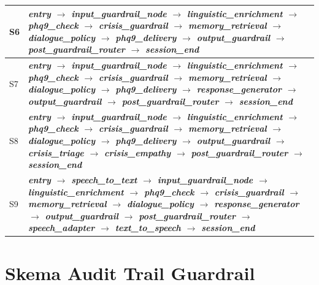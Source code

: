 \begin{longtable}{|>{\raggedright\arraybackslash}p{1.0cm}|>{\raggedright\arraybackslash}p{11.9cm}|}
\hline
S6 & \textbf{\textit{entry $\rightarrow$ input\_guardrail\_node $\rightarrow$ linguistic\_enrichment $\rightarrow$ phq9\_check $\rightarrow$ crisis\_guardrail $\rightarrow$ memory\_retrieval $\rightarrow$ dialogue\_policy $\rightarrow$ phq9\_delivery $\rightarrow$ output\_guardrail $\rightarrow$ post\_guardrail\_router $\rightarrow$ session\_end}}\\
\hline
S7 & \textbf{\textit{entry $\rightarrow$ input\_guardrail\_node $\rightarrow$ linguistic\_enrichment $\rightarrow$ phq9\_check $\rightarrow$ crisis\_guardrail $\rightarrow$ memory\_retrieval $\rightarrow$ dialogue\_policy $\rightarrow$ phq9\_delivery $\rightarrow$ response\_generator $\rightarrow$ output\_guardrail $\rightarrow$ post\_guardrail\_router $\rightarrow$ session\_end}}\\
\hline
S8 & \textbf{\textit{entry $\rightarrow$ input\_guardrail\_node $\rightarrow$ linguistic\_enrichment $\rightarrow$ phq9\_check $\rightarrow$ crisis\_guardrail $\rightarrow$ memory\_retrieval $\rightarrow$ dialogue\_policy $\rightarrow$ phq9\_delivery $\rightarrow$ output\_guardrail $\rightarrow$ crisis\_triage $\rightarrow$ crisis\_empathy $\rightarrow$ post\_guardrail\_router $\rightarrow$ session\_end}}\\
\hline
S9 & \textbf{\textit{entry $\rightarrow$ speech\_to\_text $\rightarrow$ input\_guardrail\_node $\rightarrow$ linguistic\_enrichment $\rightarrow$ phq9\_check $\rightarrow$ crisis\_guardrail $\rightarrow$ memory\_retrieval $\rightarrow$ dialogue\_policy $\rightarrow$ response\_generator $\rightarrow$ output\_guardrail $\rightarrow$ post\_guardrail\_router $\rightarrow$ speech\_adapter $\rightarrow$ text\_to\_speech $\rightarrow$ session\_end}}\\
\end{longtable}
\endgroup



\section{Skema Audit Trail Guardrail}
\label{lamp:audit}


